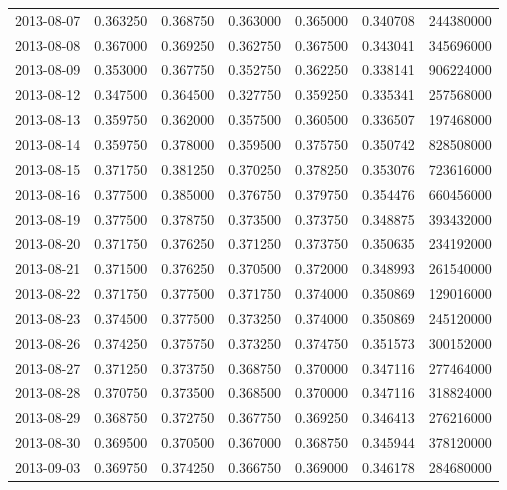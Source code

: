 \begin{tabular}{lrrrrrr}
2013-08-07 &    0.363250 &    0.368750 &    0.363000 &    0.365000 &    0.340708 &   244380000 \\
2013-08-08 &    0.367000 &    0.369250 &    0.362750 &    0.367500 &    0.343041 &   345696000 \\
2013-08-09 &    0.353000 &    0.367750 &    0.352750 &    0.362250 &    0.338141 &   906224000 \\
2013-08-12 &    0.347500 &    0.364500 &    0.327750 &    0.359250 &    0.335341 &   257568000 \\
2013-08-13 &    0.359750 &    0.362000 &    0.357500 &    0.360500 &    0.336507 &   197468000 \\
2013-08-14 &    0.359750 &    0.378000 &    0.359500 &    0.375750 &    0.350742 &   828508000 \\
2013-08-15 &    0.371750 &    0.381250 &    0.370250 &    0.378250 &    0.353076 &   723616000 \\
2013-08-16 &    0.377500 &    0.385000 &    0.376750 &    0.379750 &    0.354476 &   660456000 \\
2013-08-19 &    0.377500 &    0.378750 &    0.373500 &    0.373750 &    0.348875 &   393432000 \\
2013-08-20 &    0.371750 &    0.376250 &    0.371250 &    0.373750 &    0.350635 &   234192000 \\
2013-08-21 &    0.371500 &    0.376250 &    0.370500 &    0.372000 &    0.348993 &   261540000 \\
2013-08-22 &    0.371750 &    0.377500 &    0.371750 &    0.374000 &    0.350869 &   129016000 \\
2013-08-23 &    0.374500 &    0.377500 &    0.373250 &    0.374000 &    0.350869 &   245120000 \\
2013-08-26 &    0.374250 &    0.375750 &    0.373250 &    0.374750 &    0.351573 &   300152000 \\
2013-08-27 &    0.371250 &    0.373750 &    0.368750 &    0.370000 &    0.347116 &   277464000 \\
2013-08-28 &    0.370750 &    0.373500 &    0.368500 &    0.370000 &    0.347116 &   318824000 \\
2013-08-29 &    0.368750 &    0.372750 &    0.367750 &    0.369250 &    0.346413 &   276216000 \\
2013-08-30 &    0.369500 &    0.370500 &    0.367000 &    0.368750 &    0.345944 &   378120000 \\
2013-09-03 &    0.369750 &    0.374250 &    0.366750 &    0.369000 &    0.346178 &   284680000 \\

\end{tabular}
